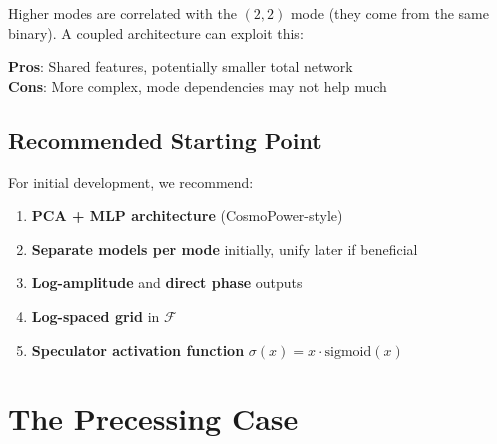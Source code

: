 \documentclass[11pt,a4paper]{article}
\newcommand{\Mf}{\mathcal{F}}
\begin{document}
Higher modes are correlated with the $(2,2)$ mode (they come from the same binary). A coupled architecture can exploit this:

\begin{center}
\end{center}

\textbf{Pros}: Shared features, potentially smaller total network \\
\textbf{Cons}: More complex, mode dependencies may not help much

\subsection{Recommended Starting Point}

For initial development, we recommend:

\begin{enumerate}
    \item \textbf{PCA + MLP architecture} (CosmoPower-style)
    \item \textbf{Separate models per mode} initially, unify later if beneficial
    \item \textbf{Log-amplitude} and \textbf{direct phase} outputs
    \item \textbf{Log-spaced grid} in $\Mf$
    \item \textbf{Speculator activation function} $\sigma(x) = x \cdot \text{sigmoid}(x)$ \cite{speculator}
\end{enumerate}

\section{The Precessing Case}
\label{sec:precession}
\end{document}
